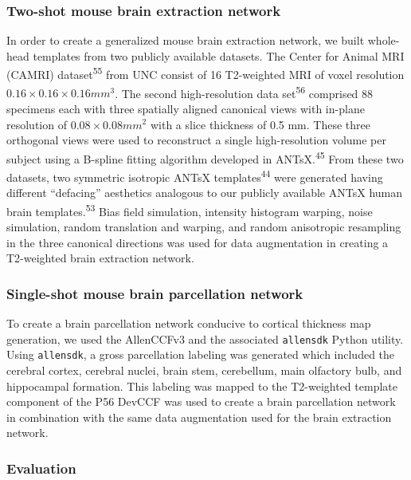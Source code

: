 \documentclass[
  12pt,
]{article}
\begin{document}
\hypertarget{two-shot-mouse-brain-extraction-network}{%
\subsubsection{Two-shot mouse brain extraction
network}\label{two-shot-mouse-brain-extraction-network}}

In order to create a generalized mouse brain extraction network, we
built whole-head templates from two publicly available datasets. The
Center for Animal MRI (CAMRI) dataset\textsuperscript{55} from UNC
consist of 16 T2-weighted MRI of voxel resolution
\(0.16 \times 0.16 \times 0.16 mm^3\). The second high-resolution data
set\textsuperscript{56} comprised 88 specimens each with three spatially
aligned canonical views with in-plane resolution of
\(0.08 \times 0.08 mm^2\) with a slice thickness of 0.5 mm. These three
orthogonal views were used to reconstruct a single high-resolution
volume per subject using a B-spline fitting algorithm developed in
ANTsX.\textsuperscript{45} From these two datasets, two symmetric
isotropic ANTsX templates\textsuperscript{44} were generated having
different ``defacing'' aesthetics analogous to our publicly available
ANTsX human brain templates.\textsuperscript{53} Bias field simulation,
intensity histogram warping, noise simulation, random translation and
warping, and random anisotropic resampling in the three canonical
directions was used for data augmentation in creating a T2-weighted
brain extraction network.

\hypertarget{single-shot-mouse-brain-parcellation-network}{%
\subsubsection{Single-shot mouse brain parcellation
network}\label{single-shot-mouse-brain-parcellation-network}}

To create a brain parcellation network conducive to cortical thickness
map generation, we used the AllenCCFv3 and the associated
\texttt{allensdk} Python utility. Using \texttt{allensdk}, a gross
parcellation labeling was generated which included the cerebral cortex,
cerebral nuclei, brain stem, cerebellum, main olfactory bulb, and
hippocampal formation. This labeling was mapped to the T2-weighted
template component of the P56 DevCCF was used to create a brain
parcellation network in combination with the same data augmentation used
for the brain extraction network.

\hypertarget{evaluation}{%
\subsubsection{Evaluation}\label{evaluation}}
\end{document}
